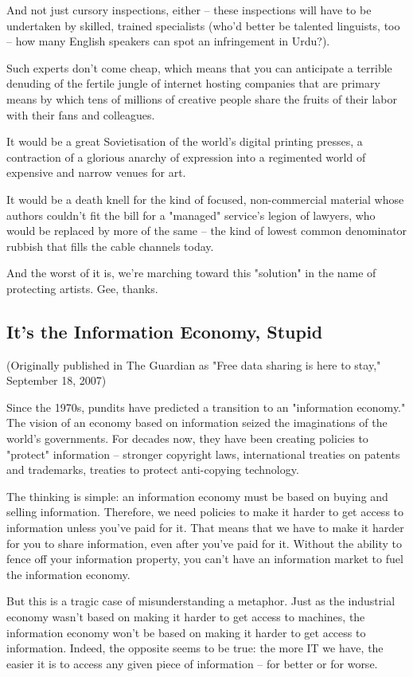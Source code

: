And not just cursory inspections, either -- these inspections will
have to be undertaken by skilled, trained specialists (who'd better
be talented linguists, too -- how many English speakers can spot an
infringement in Urdu?).

Such experts don't come cheap, which means that you can anticipate
a terrible denuding of the fertile jungle of internet hosting
companies that are primary means by which tens of millions of
creative people share the fruits of their labor with their fans and
colleagues.

It would be a great Sovietisation of the world's digital printing
presses, a contraction of a glorious anarchy of expression into a
regimented world of expensive and narrow venues for art.

It would be a death knell for the kind of focused, non-commercial
material whose authors couldn't fit the bill for a "managed"
service's legion of lawyers, who would be replaced by more of the
same -- the kind of lowest common denominator rubbish that fills
the cable channels today.

And the worst of it is, we're marching toward this "solution" in
the name of protecting artists. Gee, thanks.

\subsection{It's the Information Economy, Stupid}

(Originally published in The Guardian as "Free data sharing is here
to stay," September 18, 2007)

Since the 1970s, pundits have predicted a transition to an
"information economy." The vision of an economy based on
information seized the imaginations of the world's governments. For
decades now, they have been creating policies to "protect"
information -- stronger copyright laws, international treaties on
patents and trademarks, treaties to protect anti-copying
technology.

The thinking is simple: an information economy must be based on
buying and selling information. Therefore, we need policies to make
it harder to get access to information unless you've paid for it.
That means that we have to make it harder for you to share
information, even after you've paid for it. Without the ability to
fence off your information property, you can't have an information
market to fuel the information economy.

But this is a tragic case of misunderstanding a metaphor. Just as
the industrial economy wasn't based on making it harder to get
access to machines, the information economy won't be based on
making it harder to get access to information. Indeed, the opposite
seems to be true: the more IT we have, the easier it is to access
any given piece of information -- for better or for worse.

